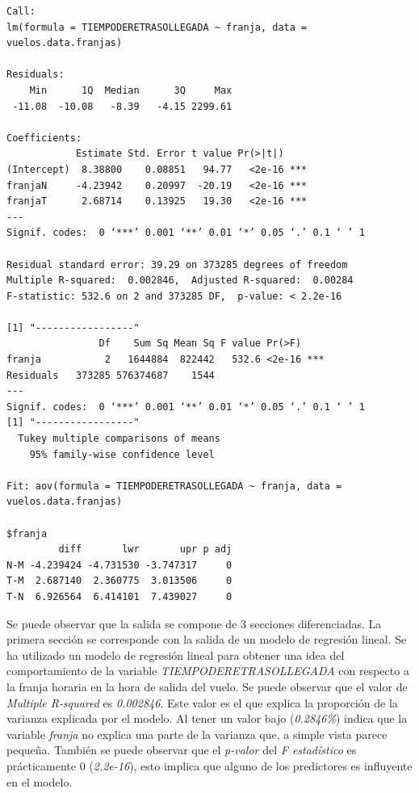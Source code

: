 \documentclass{article}
\begin{document}
\begin{lstlisting}
Call:
lm(formula = TIEMPODERETRASOLLEGADA ~ franja, data = vuelos.data.franjas)

Residuals:
    Min      1Q  Median      3Q     Max 
 -11.08  -10.08   -8.39   -4.15 2299.61 

Coefficients:
            Estimate Std. Error t value Pr(>|t|)    
(Intercept)  8.38800    0.08851   94.77   <2e-16 ***
franjaN     -4.23942    0.20997  -20.19   <2e-16 ***
franjaT      2.68714    0.13925   19.30   <2e-16 ***
---
Signif. codes:  0 ‘***’ 0.001 ‘**’ 0.01 ‘*’ 0.05 ‘.’ 0.1 ‘ ’ 1

Residual standard error: 39.29 on 373285 degrees of freedom
Multiple R-squared:  0.002846,	Adjusted R-squared:  0.00284 
F-statistic: 532.6 on 2 and 373285 DF,  p-value: < 2.2e-16

[1] "-----------------"
                Df    Sum Sq Mean Sq F value Pr(>F)    
franja           2   1644884  822442   532.6 <2e-16 ***
Residuals   373285 576374687    1544                   
---
Signif. codes:  0 ‘***’ 0.001 ‘**’ 0.01 ‘*’ 0.05 ‘.’ 0.1 ‘ ’ 1
[1] "-----------------"
  Tukey multiple comparisons of means
    95% family-wise confidence level

Fit: aov(formula = TIEMPODERETRASOLLEGADA ~ franja, data = vuelos.data.franjas)

$franja
         diff       lwr       upr p adj
N-M -4.239424 -4.731530 -3.747317     0
T-M  2.687140  2.360775  3.013506     0
T-N  6.926564  6.414101  7.439027     0
\end{lstlisting}



Se puede observar que la salida se compone de 3 secciones diferenciadas. La primera sección se corresponde con la salida de un modelo de regresión lineal. Se ha utilizado un modelo de regresión lineal para obtener una idea del comportamiento de la variable \textit{TIEMPODERETRASOLLEGADA} con respecto a la franja horaria en la hora de salida del vuelo. Se puede observar que el valor de \textit{Multiple R-squared} es \textit{0.002846}. Este valor es el que explica la proporción de la varianza explicada por el modelo. Al tener un valor bajo (\textit{0.2846\%}) indica que la variable \textit{franja} no explica una parte de la varianza que, a simple vista parece pequeña. También se puede observar que el \textit{p-valor} del \textit{F estadístico} es prácticamente 0 (\textit{2.2e-16}), esto implica que alguno de los predictores es influyente en el modelo.\\
\end{document}
